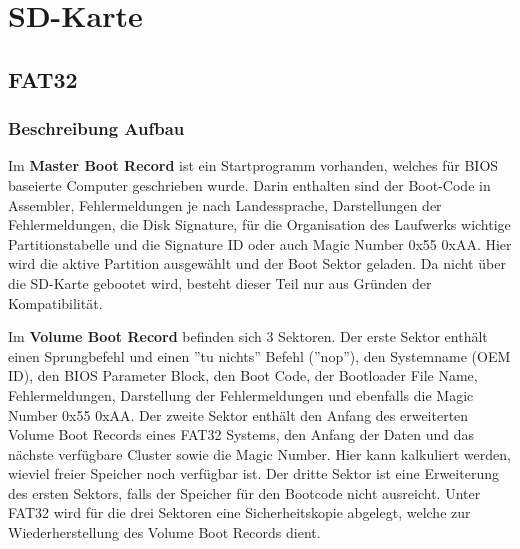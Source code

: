 \section{SD-Karte}\label{Appendix:SD_Karte}

\subsection{FAT32}\label{Appendix:FAT32}

\subsubsection{Beschreibung Aufbau}\label{Appendix:FAT32_Aufbau}

Im \textbf{Master Boot Record} ist ein Startprogramm vorhanden, welches für BIOS baseierte Computer geschrieben wurde.
Darin enthalten sind der Boot-Code in Assembler, Fehlermeldungen je nach Landessprache, Darstellungen der Fehlermeldungen, die Disk Signature, für die Organisation des Laufwerks wichtige Partitionstabelle und die Signature ID oder auch Magic Number 0x55 0xAA. Hier wird die aktive Partition ausgewählt und der Boot Sektor geladen. Da nicht über die SD-Karte gebootet wird, besteht dieser Teil nur aus Gründen der Kompatibilität. \cite{german-salescom_datenstruktur_nodate} \cite{milsch_aufbau_2009}

Im \textbf{Volume Boot Record} befinden sich 3 Sektoren. Der erste Sektor enthält einen Sprungbefehl und einen ''tu nichts'' Befehl (''nop''), den Systemname (OEM ID), den BIOS Parameter Block, den Boot Code, der Bootloader File Name, Fehlermeldungen, Darstellung der Fehlermeldungen und ebenfalls die Magic Number 0x55 0xAA. Der zweite Sektor enthält den Anfang des erweiterten Volume Boot Records eines FAT32 Systems, den Anfang der Daten und das nächste verfügbare Cluster sowie die Magic Number. Hier kann kalkuliert werden, wieviel freier Speicher noch verfügbar ist. Der dritte Sektor ist eine Erweiterung des ersten Sektors, falls der Speicher für den Bootcode nicht ausreicht. Unter FAT32 wird für die drei Sektoren eine Sicherheitskopie abgelegt, welche zur Wiederherstellung des Volume Boot Records dient.

